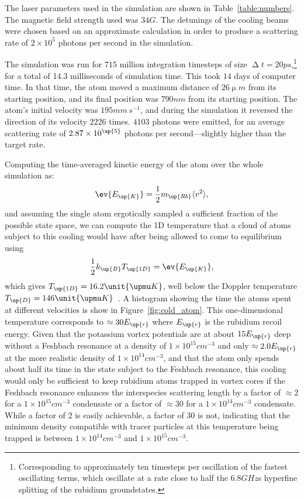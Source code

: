 The laser parameters used in the simulation are shown in Table~\ref{table:numbers}. The magnetic field strength used was $34\unit{G}$. The detunings of the cooling beams were chosen based on an approximate calculation in order to produce a scattering rate of $2\times10^{5}$ photons per second in the simulation.

The simulation was run for $715$ million integration timesteps of size $\upDelta t=20\unit{ps}$,\footnote{Corresponding to approximately ten timesteps per oscillation of the fastest oscillating terms, which oscillate at a rate close to half the $6.8\unit{GHz}$s hyperfine splitting of the rubidium groundstates.} for a total of 14.3 milliseconds of simulation time. This took $14$ days of computer time. In that time, the atom moved a maximum distance of $26\unit{\upmu m}$ from its starting position, and its final position was $790\unit{nm}$ from its starting position. The atom's initial velocity was $195 \unit{mm\,s}^{-1}$, and during the simulation it reversed the direction of its velocity $2226$ times. $4103$ photons were emitted, for an average scattering rate of $2.87\times10^\up{5}$ photons per second---slightly higher than the target rate.

Computing the time-averaged kinetic energy of the atom over the whole simulation as:
\begin{equation}
\ev{E_\up{K}} = \frac12 m_\up{Rb} \langle v^2 \rangle,
\end{equation}
and assuming the single atom ergotically sampled a sufficient fraction of the possible state space, we can compute the 1D temperature that a cloud of atoms subject to this cooling would have after being allowed to come to equilibrium using
\begin{align}
\frac12 k_\up{B} T_\up{1D} = \ev{E_\up{K}},
\end{align}
which gives  $T_\up{1D} = 16.2\unit{\upmu K}$, well below the Doppler temperature $T_\up{D} = 146\unit{\upmu K}$~\cite{steck_rubidium_2015}. A histogram showing the time the atoms spent at different velocities is show in Figure~\ref{fig:cold_atom}. This one-dimensional temperature corresponds to $\approx30E_\up{r}$ where $E_\up{r}$ is the rubidium recoil energy. Given that the potassium vortex potentials are at about $15E_\up{r}$ deep without a Feshbach resonance at a density of $1\times10^{15}\unit{cm}^{-3}$ and only $\approx 2.0E_\up{r}$ at the more realistic density of $1\times10^{14}\unit{cm}^{-3}$, and that the atom only spends about half its time in the state subject to the Feshbach resonance, this cooling would only be sufficient to keep rubidium atoms trapped in vortex cores if the Feshbach resonance enhances the interspecies scattering length by a factor of $\approx 2$ for a $1\times10^{15}\unit{cm}^{-3}$ condensate or a factor of $\approx 30$ for a $1\times10^{14}\unit{cm}^{-3}$ condensate. While a factor of $2$ is easily achievable, a factor of $30$ is not, indicating that the minimum density compatible with tracer particles at this temperature being trapped is between $1\times10^{14}\unit{cm}^{-3}$ and $1\times10^{15}\unit{cm}^{-3}$.

